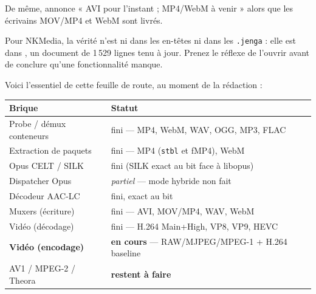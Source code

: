 De même,  annonce « AVI pour l'instant ;
MP4/WebM à venir » alors que les écrivains MOV/MP4 et WebM sont livrés.

\begin{nkretenir}
Pour NKMedia, la vérité n'est ni dans les en-têtes ni dans les
\texttt{.jenga} : elle est dans , un
document de 1\,529 lignes tenu à jour. Prenez le réflexe de l'ouvrir avant de
conclure qu'une fonctionnalité manque.
\end{nkretenir}

Voici l'essentiel de cette feuille de route, au moment de la rédaction :

\begin{center}
\begin{tabular}{@{}ll@{}}
\toprule
\textbf{Brique} & \textbf{Statut} \\
\midrule
Probe / démux conteneurs & fini — MP4, WebM, WAV, OGG, MP3, FLAC \\
Extraction de paquets    & fini — MP4 (\texttt{stbl} et fMP4), WebM \\
Opus CELT / SILK         & fini (SILK exact au bit face à libopus) \\
Dispatcher Opus          & \emph{partiel} — mode hybride non fait \\
Décodeur AAC-LC          & fini, exact au bit \\
Muxers (écriture)        & fini — AVI, MOV/MP4, WAV, WebM \\
Vidéo (décodage)         & fini — H.264 Main+High, VP8, VP9, HEVC \\
\textbf{Vidéo (encodage)} & \textbf{en cours} — RAW/MJPEG/MPEG-1 + H.264 baseline \\
AV1 / MPEG-2 / Theora    & \textbf{restent à faire} \\
\bottomrule
\end{tabular}
\end{center}

